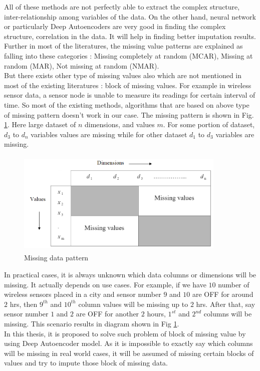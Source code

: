 \noindent  All of these methods are not perfectly able to extract the complex structure, inter-relationship among variables of the data. On the other hand, neural network or particularly Deep Autoencoders are very good in finding the complex structure, correlation in the data. It will help in finding better imputation results.  
Further in most of the literatures, the missing value patterns are explained as falling into these categories \cite{little_missing_pattern}: Missing completely at random (MCAR), Missing at random (MAR), Not missing at random (NMAR).
\\
But there exists other type of missing values also which are not mentioned in most of the existing literatures : block of missing values. For example in wireless sensor data, a sensor node is unable to measure its readings for certain interval of time. So most of the existing methods, algorithms that are based on above type of missing pattern doesn't work in our case. The missing pattern is shown in Fig. \ref{fig:missing_pattern}. Here large dataset of $n$ dimensions, and values $m$. For some portion of dataset, $d_3$ to $d_n$ variables values are missing while for other dataset $d_1$ to $d_3$ variables are missing.
\begin{figure}[H]
\centering
\includegraphics[width=10cm,height=5cm]{figures/missing_pattern.png}
\caption{\label{fig:missing_pattern} Missing data pattern  }
\end{figure}
\noindent
In practical cases, it is always unknown which data columns or dimensions will be missing. It actually depends on use cases. For example, if we have $10$ number of wireless sensors placed in a city and sensor number $9$ and $10$ are OFF for around $2$ hrs, then $9^{th}$ and $10^{th}$ column values will be missing up to $2$ hrs. After that, say sensor number $1$ and $2$ are OFF for another $2$ hours, $1^{st}$ and $2^{nd}$ columns will be missing. This scenario results in diagram shown in Fig \ref{fig:missing_pattern}.  
\\
In this thesis, it is proposed to solve such problem of block of missing value by using Deep Autoencoder model. As it is impossible to exactly say which columns will be missing in real world cases, it will be assumed of missing certain blocks of values and try to impute those block of missing data.
